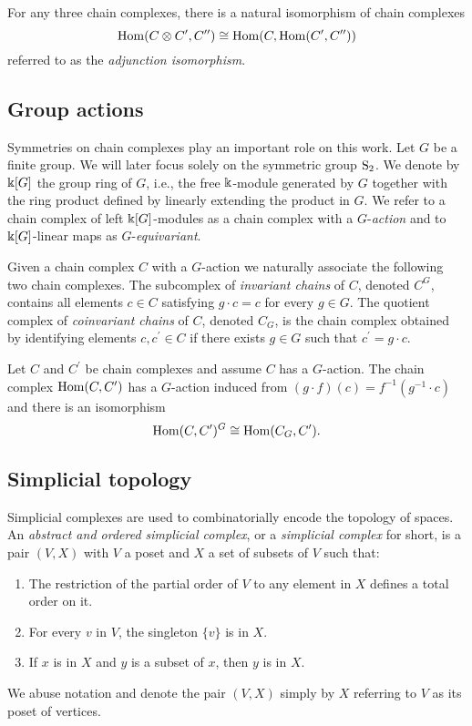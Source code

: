 For any three chain complexes, there is a natural isomorphism of chain complexes
\begin{equation} \label{e:adjunction isomorphism}
\Hom(C \otimes C^\prime, C^{\prime\prime}) \cong
\Hom(C, \Hom(C^\prime, C^{\prime\prime}))
\end{equation}
referred to as the \textit{adjunction isomorphism}.

\subsection{Group actions}

Symmetries on chain complexes play an important role on this work.
Let $G$ be a finite group.
We will later focus solely on the symmetric group $\S_2$.
We denote by $\k[G]$ the group ring of $G$, i.e., the free $\k$-module generated by $G$ together with the ring product defined by linearly extending the product in $G$.
We refer to a chain complex of left $\k[G]$-modules as a chain complex with a $G$-\textit{action} and to $\k[G]$-linear maps as $G$-\textit{equivariant}.

Given a chain complex $C$ with a $G$-action we naturally associate the following two chain complexes.
The subcomplex of \textit{invariant chains} of $C$, denoted $C^G$, contains all elements $c \in C$ satisfying $g \cdot c = c$ for every $g \in G$.
The quotient complex of \textit{coinvariant chains} of $C$, denoted $C_G$, is the chain complex obtained by identifying elements $c, c^\prime \in C$ if there exists $g \in G$ such that $c^\prime = g \cdot c$.

Let $C$ and $C^\prime$ be chain complexes and assume $C$ has a $G$-action.
The chain complex $\Hom(C, C^\prime)$ has a $G$-action induced from $(g \cdot f)(c) = f^{-1}(g^{-1} \cdot c)$ and there is an isomorphism
\begin{equation} \label{e:invariant hom iso hom coinvariants}
\Hom(C, C^\prime)^G \cong \Hom(C_G, C^\prime).
\end{equation}

\subsection{Simplicial topology}

Simplicial complexes are used to combinatorially encode the topology of spaces.
An \textit{abstract and ordered simplicial complex}, or a \textit{simplicial complex} for short, is a pair $(V, X)$ with $V$ a poset and $X$ a set of subsets of $V$ such that: 
\begin{enumerate}
	\item The restriction of the partial order of $V$ to any element in $X$ defines a total order on it.
	\item For every $v$ in $V$, the singleton $\{v\}$ is in $X$.
	\item If $x$ is in $X$ and $y$ is a subset of $x$, then $y$ is in $X$.
\end{enumerate}
We abuse notation and denote the pair $(V, X)$ simply by $X$ referring to $V$ as its poset of vertices.

